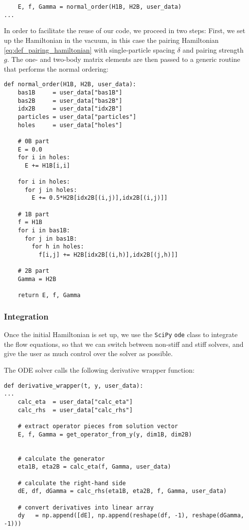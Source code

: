 {\begin{lstlisting}
    E, f, Gamma = normal_order(H1B, H2B, user_data) 
...
\end{lstlisting}
In order to facilitate the reuse of our code, we proceed in two
steps: First, we set up the Hamiltonian in the vacuum, in this case the
pairing Hamiltonian \eqref{eq:def_pairing_hamiltonian} with single-particle
spacing $\delta$ and pairing strength $g$. The one- and two-body matrix
elements are then passed to a generic routine that performs the normal ordering:
\begin{lstlisting}
def normal_order(H1B, H2B, user_data):
    bas1B     = user_data["bas1B"]
    bas2B     = user_data["bas2B"]
    idx2B     = user_data["idx2B"]
    particles = user_data["particles"]
    holes     = user_data["holes"]

    # 0B part
    E = 0.0
    for i in holes:
      E += H1B[i,i]

    for i in holes:
      for j in holes:
        E += 0.5*H2B[idx2B[(i,j)],idx2B[(i,j)]]  

    # 1B part
    f = H1B
    for i in bas1B:
      for j in bas1B:
        for h in holes:
          f[i,j] += H2B[idx2B[(i,h)],idx2B[(j,h)]]  

    # 2B part
    Gamma = H2B

    return E, f, Gamma
\end{lstlisting}

\subsubsection*{Integration}
Once the initial Hamiltonian is set up, we use the \texttt{SciPy}
\texttt{ode} class to integrate the flow equations, so that we can
switch between non-stiff and stiff solvers, and give the user as 
much control over the solver as possible.

The ODE solver calls the following derivative wrapper function:
\begin{lstlisting}
def derivative_wrapper(t, y, user_data):
...
    calc_eta  = user_data["calc_eta"]
    calc_rhs  = user_data["calc_rhs"]

    # extract operator pieces from solution vector
    E, f, Gamma = get_operator_from_y(y, dim1B, dim2B)


    # calculate the generator
    eta1B, eta2B = calc_eta(f, Gamma, user_data)

    # calculate the right-hand side
    dE, df, dGamma = calc_rhs(eta1B, eta2B, f, Gamma, user_data)

    # convert derivatives into linear array
    dy   = np.append([dE], np.append(reshape(df, -1), reshape(dGamma, -1)))


\end{lstlisting}}
